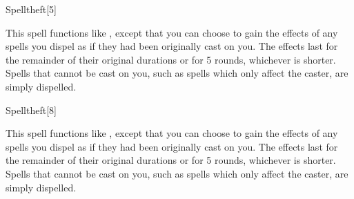 \begin{spellsection}{Spelltheft}[5]
    \begin{spellheader}
    \end{spellheader}
    \begin{spellcontent}
        \spellspecial This spell functions like , except that you can choose to gain the effects of any spells you dispel as if they had been originally cast on you. The effects last for the remainder of their original durations or for 5 rounds, whichever is shorter. Spells that cannot be cast on you, such as spells which only affect the caster, are simply dispelled.
    \end{spellcontent}
    \begin{spellfooter}
        \miscastrandom
    \end{spellfooter}
\end{spellsection}

\begin{spellsection}[Greater]{Spelltheft}[8]
    \begin{spellheader}
    \end{spellheader}
    \begin{spellcontent}
        \spellspecial This spell functions like , except that you can choose to gain the effects of any spells you dispel as if they had been originally cast on you. The effects last for the remainder of their original durations or for 5 rounds, whichever is shorter. Spells that cannot be cast on you, such as spells which only affect the caster, are simply dispelled.
    \end{spellcontent}
    \begin{spellfooter}
        \miscastyou
    \end{spellfooter}
\end{spellsection}

